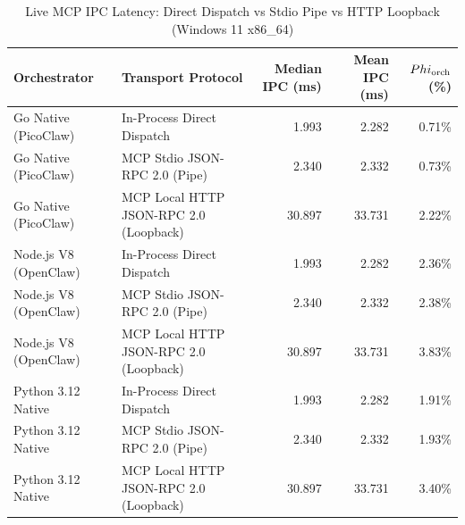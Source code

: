 \begin{table}[t]
\centering\small
\caption{Live MCP IPC Latency: Direct Dispatch vs Stdio Pipe vs HTTP Loopback (Windows 11 x86_64)}
\label{tab:Windows_mcp_transport}
\begin{tabular}{llrrr}
\toprule
Orchestrator & Transport Protocol & Median IPC (ms) & Mean IPC (ms) & $\\Phi_{\text{orch}}$ (\%) \\
\midrule
Go Native (PicoClaw) & In-Process Direct Dispatch & 1.993 & 2.282 & 0.71\% \\
Go Native (PicoClaw) & MCP Stdio JSON-RPC 2.0 (Pipe) & 2.340 & 2.332 & 0.73\% \\
Go Native (PicoClaw) & MCP Local HTTP JSON-RPC 2.0 (Loopback) & 30.897 & 33.731 & 2.22\% \\
Node.js V8 (OpenClaw) & In-Process Direct Dispatch & 1.993 & 2.282 & 2.36\% \\
Node.js V8 (OpenClaw) & MCP Stdio JSON-RPC 2.0 (Pipe) & 2.340 & 2.332 & 2.38\% \\
Node.js V8 (OpenClaw) & MCP Local HTTP JSON-RPC 2.0 (Loopback) & 30.897 & 33.731 & 3.83\% \\
Python 3.12 Native & In-Process Direct Dispatch & 1.993 & 2.282 & 1.91\% \\
Python 3.12 Native & MCP Stdio JSON-RPC 2.0 (Pipe) & 2.340 & 2.332 & 1.93\% \\
Python 3.12 Native & MCP Local HTTP JSON-RPC 2.0 (Loopback) & 30.897 & 33.731 & 3.40\% \\
\bottomrule
\end{tabular}
\end{table}
